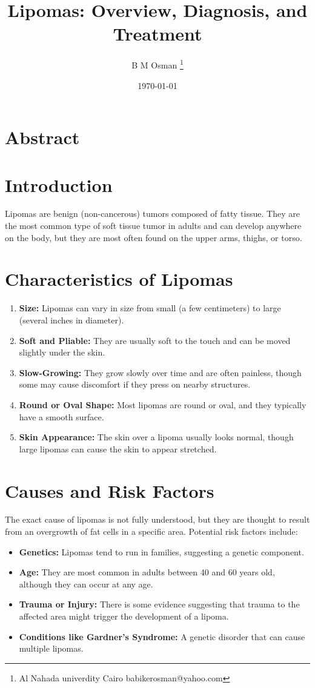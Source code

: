 \documentclass{article}
\title{Lipomas: Overview, Diagnosis, and Treatment}
\author{B M Osman  \footnote {Al Nahada univerdity Cairo \email babikerosman@yahoo.com }}
\date{\today}
\begin{document}
\maketitle
\section*{Abstract} 
\tableofcontents  


\section{Introduction}
Lipomas are benign (non-cancerous) tumors composed of fatty tissue. They are the most common type of soft tissue tumor in adults and can develop anywhere on the body, but they are most often found on the upper arms, thighs, or torso.

\section{Characteristics of Lipomas}
\begin{enumerate}
    \item \textbf{Size:} Lipomas can vary in size from small (a few centimeters) to large (several inches in diameter).
    \item \textbf{Soft and Pliable:} They are usually soft to the touch and can be moved slightly under the skin.
    \item \textbf{Slow-Growing:} They grow slowly over time and are often painless, though some may cause discomfort if they press on nearby structures.
    \item \textbf{Round or Oval Shape:} Most lipomas are round or oval, and they typically have a smooth surface.
    \item \textbf{Skin Appearance:} The skin over a lipoma usually looks normal, though large lipomas can cause the skin to appear stretched.
\end{enumerate}

\section{Causes and Risk Factors}
The exact cause of lipomas is not fully understood, but they are thought to result from an overgrowth of fat cells in a specific area. Potential risk factors include:
\begin{itemize}
    \item \textbf{Genetics:} Lipomas tend to run in families, suggesting a genetic component.
    \item \textbf{Age:} They are most common in adults between 40 and 60 years old, although they can occur at any age.
    \item \textbf{Trauma or Injury:} There is some evidence suggesting that trauma to the affected area might trigger the development of a lipoma.
    \item \textbf{Conditions like Gardner’s Syndrome:} A genetic disorder that can cause multiple lipomas.
\end{itemize}
\end{document}
